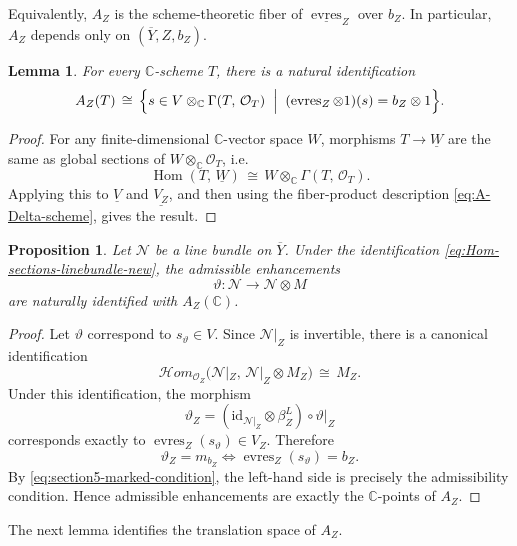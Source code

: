 \documentclass[a4paper,12pt]{amsart}
\numberwithin{equation}{section}
\newtheorem{proposition}[theorem]{Proposition}
\newtheorem{lemma}[theorem]{Lemma}
\theoremstyle{definition}
\newcommand{\OO}{\mathcal{O}}
\newcommand{\Hom}{\operatorname{Hom}}
\newcommand{\id}{\mathrm{id}}
\newcommand{\sheafHom}{\mathcal{H}om}
\newcommand{\evres}{\operatorname{evres}}
\newcommand{\CC}{\mathbb C}
\begin{document}
Equivalently, \(A_Z\) is the scheme-theoretic fiber of \(\underline{\evres}_Z\) over \(b_Z\).  In particular, \(A_Z\) depends only on \((\overline{Y},Z,b_Z)\).

\begin{lemma}\label{lem:representability-A-Delta}
For every \(\CC\)-scheme \(T\), there is a natural identification
\[
A_Z(T)
\,\cong\,
\Bigl\{
s\in V\otimes_\CC \Gamma(T,\,\OO_T)\;\Bigm|\;
(\evres_Z\otimes 1)(s)=b_Z\otimes 1
\Bigr\}.
\]
\end{lemma}
\begin{proof}
For any finite-dimensional \(\CC\)-vector space \(W\), morphisms \(T\longrightarrow \underline{W}\) are the same as global sections of \(W\otimes_\CC \OO_T\), i.e.
\[
\Hom(T,\,\underline{W})\,\cong\, W\otimes_\CC \Gamma(T,\,\OO_T).
\]
Applying this to \(\underline{V}\) and \(\underline{V_Z}\), and then using the fiber-product description \eqref{eq:A-Delta-scheme}, gives the result.
\end{proof}

\begin{proposition}\label{prop:fixed-linebundle-affine-new}
Let \(\mathcal N\) be a line bundle on \(\overline{Y}\).  Under the identification \eqref{eq:Hom-sections-linebundle-new}, the admissible enhancements
\[
\vartheta:\mathcal N\longrightarrow \mathcal N\otimes M
\]
are naturally identified with \(A_Z(\CC)\).
\end{proposition}
\begin{proof}
Let \(\vartheta\) correspond to \(s_\vartheta\in V\).  Since \(\mathcal N|_Z\) is invertible, there is a canonical identification
\[
\sheafHom_{\OO_Z}\!\bigl(\mathcal N|_Z,\,\mathcal N|_Z\otimes M_Z\bigr)\,\cong\, M_Z.
\]
Under this identification, the morphism
\[
\vartheta_Z=(\id_{\mathcal N|_Z}\otimes \beta_Z^L)\circ \vartheta|_Z
\]
corresponds exactly to \(\evres_Z(s_\vartheta)\in V_Z\).  Therefore
\[
\vartheta_Z=m_{b_Z}
\iff
\evres_Z(s_\vartheta)=b_Z.
\]
By \eqref{eq:section5-marked-condition}, the left-hand side is precisely the admissibility condition.  Hence admissible enhancements are exactly the \(\CC\)-points of \(A_Z\).
\end{proof}

The next lemma identifies the translation space of \(A_Z\).
\end{document}
